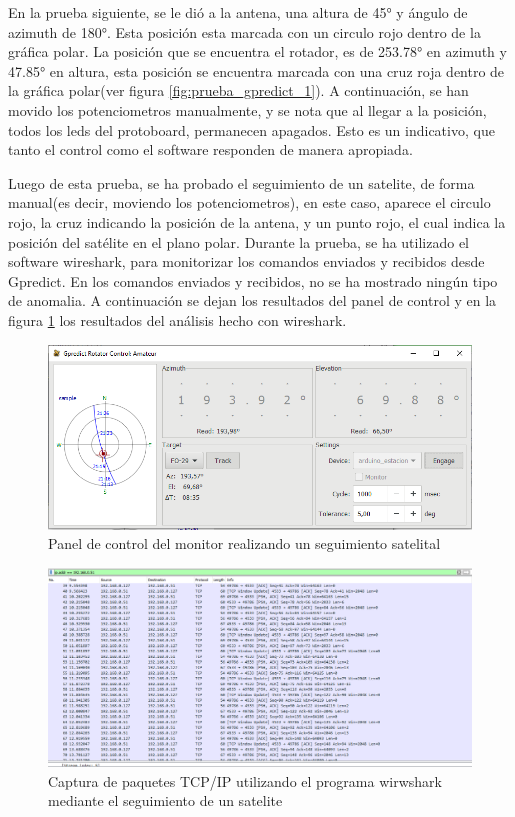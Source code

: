En la prueba siguiente, se le dió a la antena, una altura de 45° y ángulo de azimuth de 180°. Esta posición esta marcada con un circulo rojo dentro de la gráfica polar. La posición que se encuentra el rotador, es de 253.78° en azimuth y 47.85° en altura, esta posición se encuentra marcada con una cruz roja dentro de la gráfica polar(ver figura \ref{fig:prueba_gpredict_1}). A continuación, se han movido los potenciometros manualmente,  y se nota que al llegar a la posición, todos los leds del protoboard, permanecen apagados. Esto es un indicativo, que tanto el control como el software responden de manera apropiada. 

 
Luego de esta prueba, se ha probado el seguimiento de un satelite, de forma manual(es decir, moviendo los potenciometros), en este caso, aparece el circulo rojo, la cruz indicando la posición de la antena, y un punto rojo, el cual indica la posición del satélite en el plano polar. Durante la prueba, se ha utilizado el software wireshark, para monitorizar los comandos enviados y recibidos desde Gpredict. En los comandos enviados y recibidos, no se ha mostrado ningún tipo de anomalia. A continuación se dejan los resultados del panel de control y en la figura \ref{fig:wireshark_gpr} los resultados del análisis hecho con wireshark. 


\begin{figure}[ht]
	\centering
	\includegraphics[scale=0.5]{gpredict_seguimiento_sat} 
	\caption{Panel de control del monitor realizando un seguimiento satelital} 
	
\end{figure}

\begin{figure}[ht]
	\includegraphics[scale=0.5]{wireshark_gpredict} 
	\caption{Captura de paquetes TCP/IP utilizando el programa wirwshark mediante el seguimiento de un satelite} 
	\label{fig:wireshark_gpr}
\end{figure}



